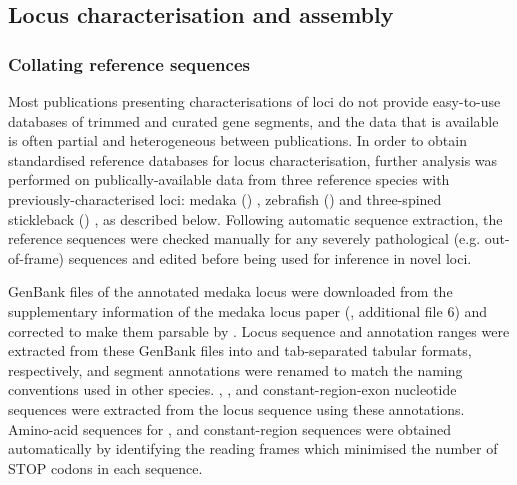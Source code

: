 \subsection{Locus characterisation and assembly}
\label{sec:methods_comp_locus}

\subsubsection{Collating reference sequences}
\label{sec:methods_comp_locus_reference}

Most publications presenting characterisations of \igh{} loci do not provide easy-to-use databases of trimmed and curated gene segments, and the data that is available is often partial and heterogeneous between publications. In order to obtain standardised reference databases for locus characterisation, further analysis was performed on publically-available data from three reference species with previously-characterised \igh{} loci: medaka () \parencite{magadan2011medaka}, zebrafish () \parencite{danilova2005zebrafish} and three-spined stickleback () \parencite{bao2010stickleback,gambondeza2011stickleback}, as described below. Following automatic sequence extraction, the reference sequences were checked manually for any severely pathological (e.g. out-of-frame) sequences and edited before being used for inference in novel loci.


\noindent GenBank files of the annotated medaka \igh{} locus were downloaded from the supplementary information of the medaka locus paper (\parencite{magadan2011medaka}, additional file 6) and corrected to make them parsable by . Locus sequence and annotation ranges were extracted from these GenBank files into  and tab-separated tabular formats, respectively, and segment annotations were renamed to match the naming conventions used in other species. \vh, \dh, \jh and constant-region-exon nucleotide sequences were extracted from the locus sequence using these annotations. Amino-acid sequences for \vh, \jh and constant-region sequences were obtained automatically by identifying the reading frames which minimised the number of STOP codons in each sequence.


